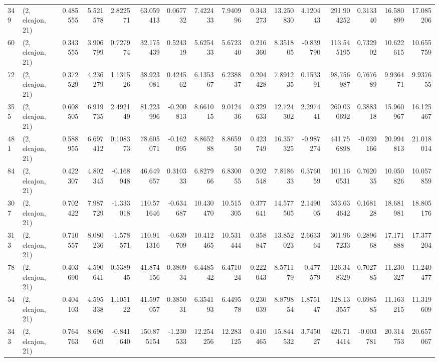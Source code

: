 \begin{tabular}{llrrrrrrrrrrrrrr}
349 &  (2, elcajon, 21) &   0.485555 &   5.521578 &   2.822571 &    63.059413 &   0.067732 &   7.422433 &   7.940996 &  0.343273 &  13.250830 &   4.120443 &   291.904252 &  0.313340 &  16.580899 &  17.085206 \\
60  &  (2, elcajon, 21) &   0.343555 &   3.906799 &   0.727974 &    32.175439 &   0.524319 &   5.625433 &   5.672340 &  0.216360 &   8.351805 &  -0.839790 &   113.545195 &  0.732902 &  10.622615 &  10.655759 \\
72  &  (2, elcajon, 21) &   0.372529 &   4.236279 &   1.131526 &    38.923081 &   0.424562 &   6.135367 &   6.238837 &  0.204428 &   7.891235 &   0.153391 &    98.756987 &  0.767689 &   9.936471 &   9.937655 \\
355 &  (2, elcajon, 21) &   0.608505 &   6.919735 &   2.492149 &    81.223996 &  -0.200813 &   8.661015 &   9.012436 &  0.329633 &  12.724302 &   2.297441 &   260.030692 &  0.388318 &  15.960967 &  16.125467 \\
481 &  (2, elcajon, 21) &   0.588955 &   6.697412 &   0.108373 &    78.605071 &  -0.162095 &   8.865288 &   8.865950 &  0.423749 &  16.357325 &  -0.987274 &   441.756898 & -0.039166 &  20.994813 &  21.018014 \\
84  &  (2, elcajon, 21) &   0.422307 &   4.802345 &  -0.168948 &    46.649657 &   0.310333 &   6.827966 &   6.830055 &  0.202548 &   7.818633 &   0.376059 &   101.160531 &  0.762035 &  10.050826 &  10.057859 \\
307 &  (2, elcajon, 21) &   0.702422 &   7.987729 &  -1.333018 &   110.571646 &  -0.634687 &  10.430470 &  10.515305 &  0.377641 &  14.577505 &   2.149005 &   353.634642 &  0.168128 &  18.681981 &  18.805176 \\
313 &  (2, elcajon, 21) &   0.710557 &   8.080236 &  -1.578571 &   110.911316 &  -0.639709 &  10.412465 &  10.531444 &  0.358847 &  13.852023 &   2.663364 &   301.967233 &  0.289668 &  17.171888 &  17.377204 \\
78  &  (2, elcajon, 21) &   0.403690 &   4.590641 &   0.538945 &    41.874156 &   0.380934 &   6.448542 &   6.471024 &  0.222043 &   8.571179 &  -0.477579 &   126.348329 &  0.702785 &  11.230327 &  11.240477 \\
54  &  (2, elcajon, 21) &   0.404103 &   4.595338 &   1.105122 &    41.597057 &   0.385031 &   6.354193 &   6.449578 &  0.230039 &   8.879854 &   1.875147 &   128.133557 &  0.698585 &  11.163215 &  11.319609 \\
343 &  (2, elcajon, 21) &   0.764763 &   8.696649 &  -0.841640 &   150.875154 &  -1.230533 &  12.254256 &  12.283125 &  0.410465 &  15.844532 &   3.745027 &   426.714414 & -0.003781 &  20.314753 &  20.657067 \\

\end{tabular}
